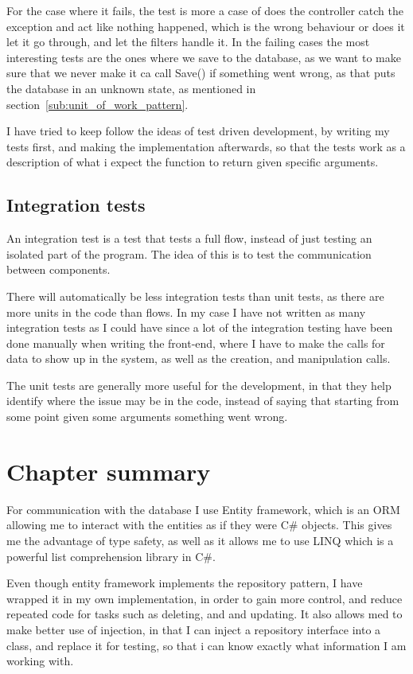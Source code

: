 For the case where it fails, the test is more a case of does the controller
catch the exception and act like nothing happened, which is the wrong behaviour
or does it let it go through, and let the filters handle it. In the failing
cases the most interesting tests are the ones where we save to the database, as
we want to make sure that we never make it ca call Save() if something went
wrong, as that puts the database in an unknown state, as mentioned in
section~\ref{sub:unit_of_work_pattern}.

I have tried to keep follow the ideas of test driven development, by writing my
tests first, and making the implementation afterwards, so that the tests work as
a description of what i expect the function to return given specific arguments.

\subsection{Integration tests}
\label{sec:integration_tests}
An integration test is a test that tests a full flow, instead of just testing an
isolated part of the program. The idea of this is to test the communication
between components.

There will automatically be less integration tests than unit tests, as there are
more units in the code than flows. In my case I have not written as many
integration tests as I could have since a lot of the integration testing have
been done manually when writing the front-end, where I have to make the calls for
data to show up in the system, as well as the creation, and manipulation calls.

The unit tests are generally more useful for the development, in that they help
identify where the issue may be in the code, instead of saying that starting
from some point given some arguments something went wrong.

\section{Chapter summary}
For communication with the database I use Entity framework, which is an ORM
allowing me to interact with the entities as if they were C\# objects. This
gives me the advantage of type safety, as well as it allows me to use LINQ which
is a powerful list comprehension library in C\#.

Even though entity framework implements the repository pattern, I have wrapped
it in my own implementation, in order to gain more control, and reduce repeated
code for tasks such as deleting, and and updating. It also allows med to make
better use of injection, in that I can inject a repository interface into a
class, and replace it for testing, so that i can know exactly what information I
am working with.

